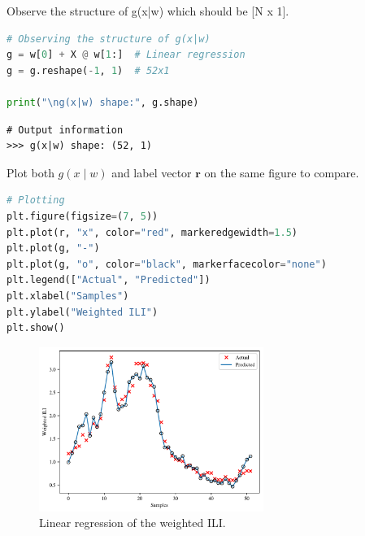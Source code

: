 \documentclass[11pt,a4paper]{article}
\begin{document}


\item Observe the structure of g(x|w) which should be [N x 1].

\begin{lstlisting}[language=Python]
# Observing the structure of g(x|w)
g = w[0] + X @ w[1:]  # Linear regression
g = g.reshape(-1, 1)  # 52x1

print("\ng(x|w) shape:", g.shape)
\end{lstlisting}

\begin{lstlisting}[numbers=none, framexleftmargin=2mm, xleftmargin=2mm, framexrightmargin=2mm, xrightmargin=2mm]
# Output information
>>> g(x|w) shape: (52, 1)
\end{lstlisting}


\item Plot both $g(x \mid w)$ and label vector $\mathbf{r}$ on the same figure to compare.

\begin{lstlisting}[language=Python]
# Plotting
plt.figure(figsize=(7, 5))
plt.plot(r, "x", color="red", markeredgewidth=1.5)
plt.plot(g, "-")
plt.plot(g, "o", color="black", markerfacecolor="none")
plt.legend(["Actual", "Predicted"])
plt.xlabel("Samples")
plt.ylabel("Weighted ILI")
plt.show()
\end{lstlisting}

\begin{figure}[ht!]
  \centering
  \includegraphics[width=0.65\textwidth]{figs/flu_data_pred.pdf}
  \caption{Linear regression of the weighted ILI.}
\end{figure}
\end{document}
